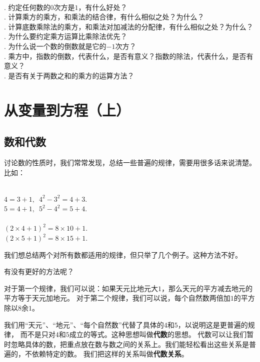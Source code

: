 \documentclass[12pt,UTF8,fontset=none]{ctexbook}
\begin{document}
\begin{sk}\label{sk:0-2-0}
    \mbox{}\\
    . 约定任何数的$0$次方是$1$，有什么好处？\\
    . 计算乘方的乘方，和乘法的结合律，有什么相似之处？为什么？\\
    . 计算底数乘除法的乘方，和乘法对加减法的分配律，有什么相似之处？为什么？\\
    . 为什么要约定乘方运算比乘除法优先？\\
    . 为什么说一个数的倒数就是它的$-1$次方？\\
    . 乘方中，指数的倒数，代表什么，是否有意义？指数的除法，代表什么，是否有意义？\\
    . 是否有关于两数之和的乘方的运算方法？
\end{sk}

\chapter{从变量到方程（上）}

\section{数和代数}
讨论数的性质时，我们常常发现，总结一些普遍的规律，需要用很多话来说清楚。比如：
\begin{ex}\label{ex:1-0-0}
    \mbox{} \\ 
    \indent $4 = 3 + 1,\,\,\, 4^2 - 3^2 = 4 + 3.$ \\
    \indent $5 = 4 + 1, \,\,\,5^2 - 4^2 = 5 + 4.$\\
    \mbox{}\\
    \indent $(2 \times 4 + 1)^2 = 8 \times 10 + 1.$\\
    \indent $(2 \times 5 + 1)^2 = 8 \times 15 + 1.$
\end{ex}
我们想总结两个对所有数都适用的规律，但只举了几个例子。这种方法不好。

有没有更好的方法呢？

对于第一个规律，我们可以说：如果天元比地元大$1$，那么天元的平方减去地元的平方等于天元加地元。
对于第二个规律，我们可以说，每个自然数两倍加$1$的平方除以$8$余$1$。

我们用“天元”、“地元”、“每个自然数”代替了具体的$4$和$5$，以说明这是更普遍的规律，
而不是只对$4$和$5$成立的等式。这种思想叫做\textbf{代数}的思想。
代数可以让我们暂时忽略具体的数，把重点放在数与数之间的关系上。我们能轻松看出这些关系是普遍的，不依赖特定的数。
我们把这样的关系叫做\textbf{代数关系}。
\end{document}
